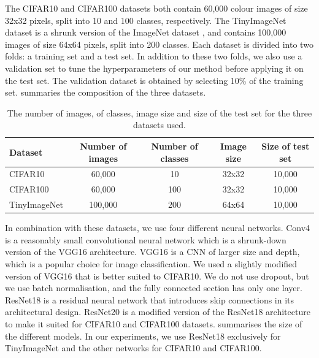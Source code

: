 The CIFAR10 and CIFAR100 datasets both contain 60,000 colour images of size
32x32 pixels, split into 10 and 100 classes, respectively. The TinyImageNet
dataset is a shrunk version of the ImageNet dataset
\cite{DBLP:journals/ijcv/RussakovskyDSKS15}, and contains 100,000 images of size
64x64 pixels, split into 200 classes. Each dataset is divided into two folds: a
training set and a test set. In addition to these two folds, we also use a
validation set to tune the hyperparameters of our method before applying it on
the test set. The validation dataset is obtained by selecting 10\% of the
training set.  summaries the composition of the three
datasets.\\


\begin{table}[ht]
  \centering
  \begin{tabular}{lcccc}
    \toprule
    \textbf{Dataset} & \textbf{Number of images} & \textbf{Number of classes} &
    \textbf{Image size} & \textbf{Size of test set} \\ 
    \hline
    CIFAR10 & 60,000 & 10 & 32x32 & 10,000 \\ 
    CIFAR100 & 60,000 & 100 & 32x32 & 10,000\\ 
    TinyImageNet & 100,000 & 200 & 64x64 &10,000 \\ 
    \bottomrule
  \end{tabular}
  \caption{The number of images, of classes, image size and size of the test set for the three datasets used.}
  \label{tab:chap1:datasets}
\end{table}

In combination with these datasets, we use four different neural networks. Conv4
is a reasonably small convolutional neural network which is a
shrunk-down version of the VGG16 architecture. VGG16 is a \acl{CNN}
of larger size and depth, which is a popular choice for image classification. We
used a slightly modified version of VGG16 that is better suited to CIFAR10. We
do not use dropout, but we use batch normalisation, and the fully connected
section has only one layer. ResNet18 is a residual neural network that
introduces skip connections in its architectural design. ResNet20 is a modified
version of the ResNet18 architecture to make it suited for CIFAR10 and CIFAR100
datasets.  summarises the size of the different
models. In our experiments, we use ResNet18 exclusively for TinyImageNet and the
other networks for CIFAR10 and CIFAR100.\\


